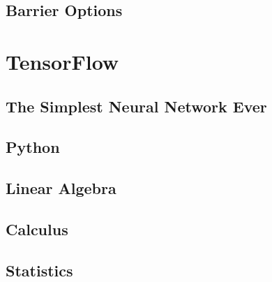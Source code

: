 \documentclass[
]{book}
\theoremstyle{definition}
\theoremstyle{definition}
\theoremstyle{definition}
\theoremstyle{remark}
\begin{document}
\hypertarget{barrier-options}{%
\chapter{Barrier Options}\label{barrier-options}}

\hypertarget{part-tensorflow}{%
\part{TensorFlow}\label{part-tensorflow}}

\hypertarget{the-simplest-neural-network-ever}{%
\chapter{The Simplest Neural Network Ever}\label{the-simplest-neural-network-ever}}

\hypertarget{appendix-appendix}{%
\appendix}


\hypertarget{python}{%
\chapter{Python}\label{python}}

\hypertarget{linear-algebra}{%
\chapter{Linear Algebra}\label{linear-algebra}}

\hypertarget{calculus}{%
\chapter{Calculus}\label{calculus}}

\hypertarget{statistics}{%
\chapter{Statistics}\label{statistics}}
\end{document}
